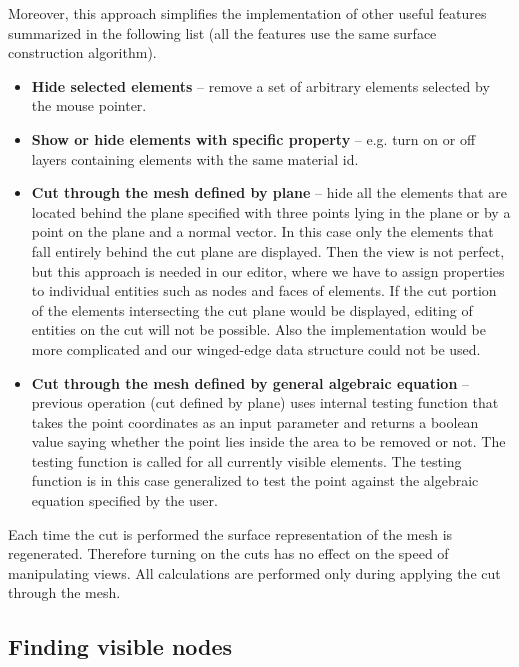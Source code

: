 Moreover, this approach simplifies the implementation of other useful features summarized in the following list (all the features use the same surface construction algorithm).

\begin{itemize}
	\item \textbf{Hide selected elements} -- remove a set of arbitrary elements selected by the mouse pointer.
	\item \textbf{Show or hide elements with specific property} -- e.g. turn on or off layers containing elements with the same material id.
	\item \textbf{Cut through the mesh defined by plane} -- hide all the elements that are located behind the plane specified with three points lying in the plane or by a point on the plane and a normal vector. In this case only the elements that fall entirely behind the cut plane are displayed. Then the view is not perfect, but this approach is needed in our editor, where we have to assign properties to individual entities such as nodes and faces of elements. If the cut portion of the elements intersecting the cut plane would be displayed, editing of entities on the cut will not be possible. Also the implementation would be more complicated and our winged-edge data structure could not be used.
	\item \textbf{Cut through the mesh defined by general algebraic equation} -- previous operation (cut defined by plane) uses internal testing function that takes the point coordinates as an input parameter and returns a boolean value saying whether the point lies inside the area to be removed or not. The testing function is called for all currently visible elements. The testing function is in this case generalized to test the point against the algebraic equation specified by the user.
\end{itemize}

Each time the cut is performed the surface representation of the mesh is regenerated. Therefore turning on the cuts has no effect on the speed of manipulating views. All calculations are performed only during applying the cut through the mesh.


\subsection{Finding visible nodes}

